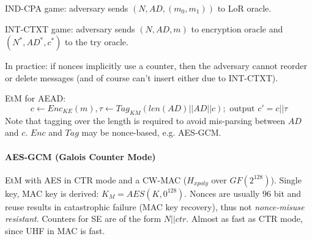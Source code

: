 IND-CPA game:
adversary sends $(N, AD, (m_0, m_1))$ to LoR oracle.

INT-CTXT game:
adversary sends $(N, AD, m)$ to encryption oracle and $(N^*, AD^*, c^*)$ to the try oracle.

In practice: if nonces implicitly use a counter, then the adversary cannot reorder or delete messages (and of course can't insert either due to INT-CTXT).

EtM for AEAD:
$$
c \leftarrow Enc_{KE}(m), \tau \leftarrow Tag_{KM}(len(AD)||AD||c) ; \text{ output } c'=c||\tau
$$
Note that tagging over the length is required to avoid mis-parsing between $AD$ and $c$.
$Enc$ and $Tag$ may be nonce-based, e.g. AES-GCM.

\paragraph{AES-GCM (Galois Counter Mode)}
EtM with AES in CTR mode and a CW-MAC ($H_{xpoly}$ over $GF(2^{128})$).
Single key, MAC key is derived: $K_M = AES(K, 0^{128})$.
Nonces are usually 96 bit and reuse results in catastrophic failure (MAC key recovery), thus not \emph{nonce-misuse resistant}.
Counters for SE are of the form $N||ctr$.
Almost as fast as CTR mode, since UHF in MAC is fast.

